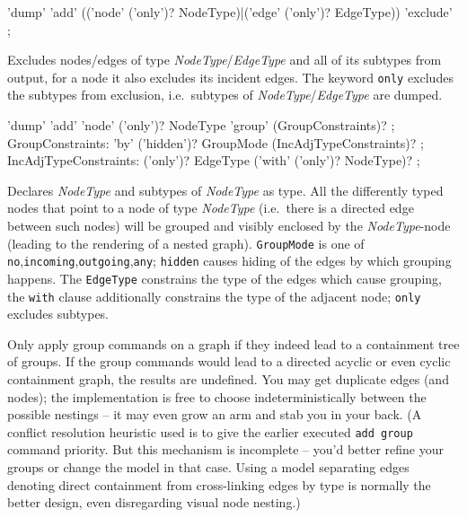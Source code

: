 \begin{rail}
  'dump' 'add' (('node' ('only')? NodeType)|('edge' ('only')? EdgeType)) 'exclude' ;
\end{rail}
Excludes nodes/edges of type \emph{NodeType}/\emph{EdgeType} and all of its subtypes from output, for a node it also excludes its incident edges.
The keyword \texttt{only} excludes the subtypes from exclusion, i.e.\ subtypes of \emph{NodeType}/\emph{EdgeType} are dumped.

\begin{rail}
  'dump' 'add' 'node' ('only')? NodeType 'group' (GroupConstraints)? ;
GroupConstraints:
  'by' ('hidden')? GroupMode (IncAdjTypeConstraints)? ;
IncAdjTypeConstraints:
  ('only')? EdgeType ('with' ('only')? NodeType)? ;
\end{rail}
Declares \emph{NodeType} and subtypes of \emph{NodeType} as  type.
All the differently typed nodes that point to a node of type \emph{NodeType}
(i.e.\ there is a directed edge between such nodes) will be grouped and visibly enclosed by the \emph{NodeType}-node (leading to the rendering of a nested graph).
\texttt{GroupMode} is one of \texttt{no},\texttt{incoming},\texttt{outgoing},\texttt{any}; \texttt{hidden} causes hiding of the edges by which grouping happens.
The \texttt{EdgeType} constrains the type of the edges which cause grouping, the \texttt{with} clause additionally constrains the type of the adjacent node;
\texttt{only} excludes subtypes.

\begin{warning}
Only apply group commands on a graph if they indeed lead to a containment tree of groups.
If the group commands would lead to a directed acyclic or even cyclic containment graph, the results are undefined.
You may get duplicate edges (and nodes); the implementation is free to choose indeterministically between the possible nestings -- it may even grow an arm and stab you in your back.
(A conflict resolution heuristic used is to give the earlier executed \texttt{add group} command priority.
But this mechanism is incomplete -- you'd better refine your groups or change the model in that case.
Using a model separating edges denoting direct containment from cross-linking edges by type is normally the better design, even disregarding visual node nesting.)
\end{warning}

